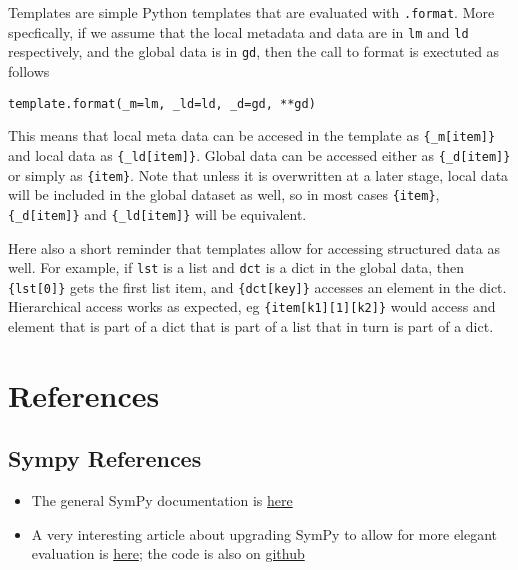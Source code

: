 \documentclass[11pt]{article}
\def\tightlist{}
\begin{document}
Templates are simple Python templates that are evaluated with
\texttt{.format}. More specfically, if we assume that the local metadata
and data are in \texttt{lm} and \texttt{ld} respectively, and the global
data is in \texttt{gd}, then the call to format is exectuted as follows

\begin{verbatim}
template.format(_m=lm, _ld=ld, _d=gd, **gd)
\end{verbatim}

This means that local meta data can be accesed in the template as
\texttt{\{\_m{[}item{]}\}} and local data as
\texttt{\{\_ld{[}item{]}\}}. Global data can be accessed either as
\texttt{\{\_d{[}item{]}\}} or simply as \texttt{\{item\}}. Note that
unless it is overwritten at a later stage, local data will be included
in the global dataset as well, so in most cases \texttt{\{item\}},
\texttt{\{\_d{[}item{]}\}} and \texttt{\{\_ld{[}item{]}\}} will be
equivalent.

Here also a short reminder that templates allow for accessing structured
data as well. For example, if \texttt{lst} is a list and \texttt{dct} is
a dict in the global data, then \texttt{\{lst{[}0{]}\}} gets the first
list item, and \texttt{\{dct{[}key{]}\}} accesses an element in the
dict. Hierarchical access works as expected, eg
\texttt{\{item{[}k1{]}{[}1{]}{[}k2{]}\}} would access and element that
is part of a dict that is part of a list that in turn is part of a dict.


\hypertarget{references}{%
\section{References}\label{references}}

\hypertarget{sympy-references}{%
\subsection{Sympy References}\label{sympy-references}}

\begin{itemize}
\tightlist
\item
  The general SymPy documentation is
  \href{https://docs.sympy.org/latest/index.html}{here}
\item
  A very interesting article about upgrading SymPy to allow for more
  elegant evaluation is
  \href{https://awstip.com/customizing-pythons-sympy-for-easy-equation-manipulation-ca30b9d0dabf}{here};
  the code is also on
  \href{https://github.com/mathcube7/customize-sympy/blob/main/customizer.py}{github}
\end{itemize}
\end{document}

